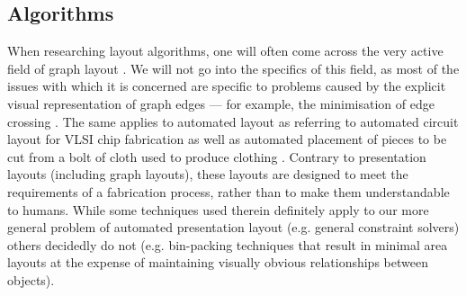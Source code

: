 
   \subsection{Algorithms}
    \label{related-algorithms}

    When researching layout algorithms, one will often come across the very
    active field of graph layout \citep{battista-1}. We will not go into the
    specifics of this field, as most of the issues with which it is concerned
    are specific to problems caused by the explicit visual representation of
    graph edges --- for example, the minimisation of edge crossing
    \citep{battista-2, shahrokhi-1}. The same applies to automated layout as
    referring to automated circuit layout for VLSI chip fabrication
    \citep{hu-1, lengauer-1} as well as automated placement of pieces to be cut
    from a bolt of cloth used to produce clothing \citep{milenkovic-1}.
    Contrary to presentation layouts (including graph layouts), these layouts
    are designed to meet the requirements of a fabrication process, rather than
    to make them understandable to humans. While some techniques used therein
    definitely apply to our more general problem of automated presentation
    layout (e.g. general constraint solvers) others decidedly do not (e.g.
    bin-packing techniques \citep{hofri-1} that result in minimal area layouts
    at the expense of maintaining visually obvious relationships between
    objects).

